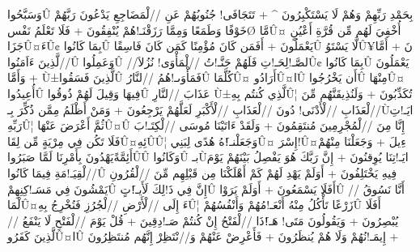 \documentclass[12pt]{book}
\begin{document}
\begin{RLtext}
 وَسَبَّحُوا^^db^^9f بِحَمْدِ رَبِّهِمْ وَهُمْ لَا يَسْتَكْبِرُونَ ^ + تَتَجَافَى! جُنُوبُهُمْ عَنِ //لْمَضَاجِعِ يَدْعُونَ رَبَّهُمْ خَوْفًا وَطَمَعًا وَمِمَّا رَزَقْنَـ!هُمْ يُنْفِقُونَ + فَلَا تَعْلَمُ نَفْس^^d8^^95 مَّا^^db^^a4 أُخْفِيَ لَهُم مِّن قُرَّةِ أَعْيُنٍ جَزَا^^db^^a4ءَ^^db^^a2 بِمَا كَانُوا^^db^^9f يَعْمَلُونَ + أَفَمَن كَانَ مُؤْمِنًا كَمَن كَانَ فَاسِقًا^^db^^9a لَّا يَسْتَوُ^^db^^a5نَ + أَمَّا //لَّذِينَ ءَاَمَنُوا^^db^^9f وَعَمِلُوا^^db^^9f //لصَّـ!لِحَـ!تِ فَلَهُمْ جَنَّـ!تُ //لْمَأْوَى! نُزُلاَ^^db^^a2 بِمَا كَانُوا^^db^^9f يَعْمَلُونَ + وَأَمَّا ^^d9^^b1لَّذِينَ فَسَقُوا^^db^^9f فَمَأْوَىـ!هُمُ //لنَّارُ^^db^^96 كُلَّمَا^^db^^a4 أَرَادُو^^db^^a4ا^^db^^9f أَن يَخْرُجُوا^^db^^9f مِنْهَا^^db^^a4 أُعِيدُوا^^db^^9f فِيهَا وَقِيلَ لَهُمْ ذُوقُوا^^db^^9f عَذَابَ //لنَّارِ ^^d9^^b1لَّذِي كُنتُم بِهِ^^db^^a6 تُكَذِّبُونَ + وَلَنُذِيقَنَّهُم مِّنَ //لْعَذَابِ //لْأَدْنَى! دُونَ //لْعَذَابِ //لْأَكْبَرِ لَعَلَّهُمْ يَرْجِعُونَ + وَمَنْ أَظْلَمُ مِمَّن ذُكِّرَ بِـ^^d9^^94ايَـ!تِ رَبِّهِ^^db^^a6 ثُمَّ أَعْرَضَ عَنْهَا^^db^^a4^^db^^9a إِنَّا مِنَ //لْمُجْرِمِينَ مُنتَقِمُونَ + وَلَقَدْ ءَاتَيْنَا مُوسَى //لْكِتَـ!بَ فَلَا تَكُن فِي مِرْيَةٍ مِّن لِقَا^^db^^a4ئِهِ^^db^^96^^db^^a6 وَجَعَلْنـ!َهُ هُدًى لِبَنِي^^db^^a4 إِسْرَ!^^db^^a4ءِيلَ + وَجَعَلْنَا مِنْهُمْ أَئِمَّةًيَهْدُونَ بِأَمْرِنَا لَمَّا صَبَرُوا^^db^^9f^^db^^96 وَكَانُوا^^db^^9f بـ^^d9^^94ايَـ!تِنَا يُوِقنُونَ + إِنَّ رَبَّكَ هُوَ يَفْصِلُ بَيْنَهُمْ يَوْمَ //لْقِيَـ!مَةِ فِيمَا كَانُوا^^db^^9f فِيهِ يَخْتَلِفُونَ + أَوَلَمْ يَهْدِ لَهُمْ كَمْ أَهْلَكْنَا مِن قَبْلِهِم مِّنَ //لْقُرُونِ يَمْشُونَ فِي مَسَـ!كِنِهِمْ^^db^^9a إِنَّ فِي ذَ!لِكَ لَأَيـ!َتٍ^^db^^96 أَفَلَا يَسْمَعُونَ + أَوَلَمْ يَرَوْا^^db^^9f أَنَّا نَسُوقُ //لْمَا^^db^^a4ءَ إِلَى //لْأَرْضِ //لْجُرُزِ فَنُخْرِجُ بِهِ^^db^^a6 زَرْعًا تَأْكُلُ مِنْهُ أَنْعَـ!مُهُمْ وَأَنْفُسُهُمْ^^db^^96 أَفَلَا يُبْصِرُونَ + وَيَقُولُونَ مَتَى! هَـ!َذَا //لْفَتْحُ إِنْ كُنتُمْ صَـ!دِقِينَ + قُلْ يَوْمَ //لْفَتْحِ لَا يَنْفَعُ //لَّذِينَ كَفَرُو^^db^^a4ا^^db^^9f إِيمَـ!نُهُمْ وَلَا هُمْ يُنظَرُونَ + فَأَعْرِضْ عَنْهُمْ وَ//نْتَظِرْ إِنَّهُم مُنتَظِرُونَ + 
\end{RLtext}
\end{document}
